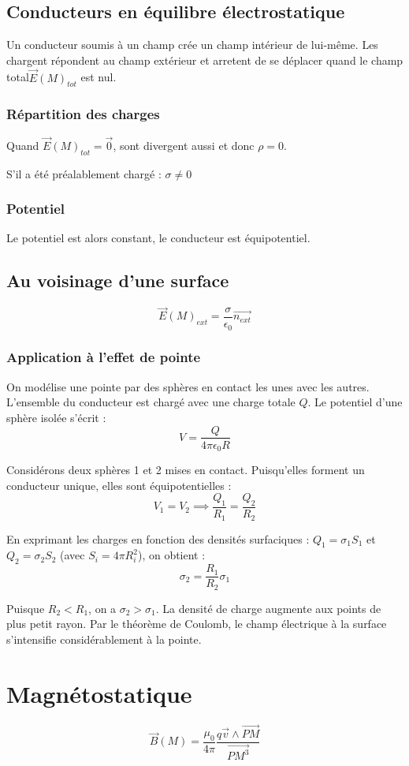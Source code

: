\documentclass[french]{yLectureNote}
\renewcommand{\vec}{\overrightarrow}
\newcommand{\E}{\vec{E}(M)}
\newcommand{\B}{\vec{B}(M)}
\begin{document}
\subsection{Conducteurs en équilibre électrostatique}
Un conducteur soumis à un champ crée un champ intérieur de lui-m\^eme.
Les chargent répondent au champ extérieur et arretent de se déplacer quand le champ total$\E_{tot}$ est nul.
\subsubsection{Répartition des charges}
Quand $\E_{tot} = \vec{0}$, sont divergent aussi et donc $\rho=0$. 

S'il a été préalablement chargé : $\sigma \neq 0$
\subsubsection{Potentiel}
Le potentiel est alors constant, le conducteur est équipotentiel.
\subsection{Au voisinage d'une surface}
\begin{theorem}
    $$\E_{ext} = \frac{\sigma}{\epsilon_0}\vec{n_{ext}}$$
\end{theorem}
\subsubsection{Application à l'effet de pointe}

On modélise une pointe par des sphères en contact les unes avec les autres. L'ensemble du conducteur est chargé avec une charge totale $Q$. Le potentiel d'une sphère isolée s'écrit :
$$V = \frac{Q}{4\pi\epsilon_0 R}$$

Considérons deux sphères 1 et 2 mises en contact. Puisqu'elles forment un conducteur unique, elles sont équipotentielles :
$$V_1 = V_2 \implies \frac{Q_1}{R_1} = \frac{Q_2}{R_2}$$

En exprimant les charges en fonction des densités surfaciques : $Q_1 = \sigma_1 S_1$ et $Q_2 = \sigma_2 S_2$ (avec $S_i = 4\pi R_i^2$), on obtient :
$$\sigma_2 = \frac{R_1}{R_2}\sigma_1$$

Puisque $R_2 < R_1$, on a $\sigma_2 > \sigma_1$. La densité de charge augmente aux points de plus petit rayon. Par le théorème de Coulomb, le champ électrique à la surface s'intensifie considérablement à la pointe.
\section{Magnétostatique}
\begin{theorem}
    $$\B = \frac{\mu_0}{4\pi}\frac{q\vec{v}\wedge \vec{PM}}{\vec{PM^3}}$$
\end{theorem}
\end{document}
